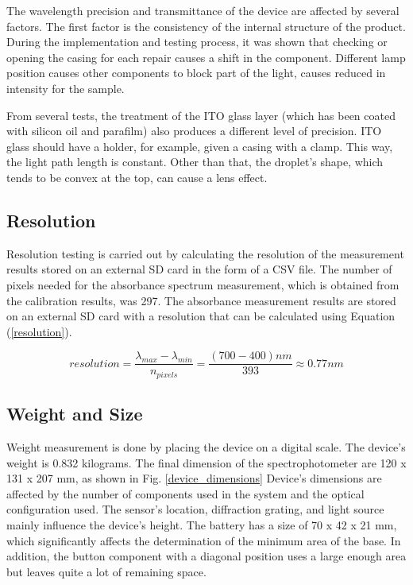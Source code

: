 \documentclass[conference]{IEEEtran}
\begin{document}
The wavelength precision and transmittance of the device are affected by several factors. 
The first factor is the consistency of the internal structure of the product.
During the implementation and testing process, it was shown that checking or opening the casing for each repair causes a shift in the component. 
Different lamp position causes other components to block part of the light, causes reduced in intensity for the sample.

From several tests, the treatment of the ITO glass layer (which has been coated with silicon oil and parafilm) also produces a different level of precision. 
ITO glass should have a holder, for example, given a casing with a clamp. 
This way, the light path length is constant. Other than that, the droplet's shape, which tends to be convex at the top, can cause a lens effect\cite{b5}.
    
\subsection{Resolution}
Resolution testing is carried out by calculating the resolution of the measurement results stored on an external SD card in the form of a CSV file.
The number of pixels needed for the absorbance spectrum measurement, which is obtained from the calibration results, was 297.
The absorbance measurement results are stored on an external SD card with a resolution that can be calculated using Equation (\ref{resolution}).

    \begin{equation}
    resolution=\frac{\lambda_{max} - \lambda_{min}}{n_{pixels}}=\frac{(700 - 400)nm}{393}\approx0.77nm
    \label{resolution}
    \end{equation}

\subsection{Weight and Size}
Weight measurement is done by placing the device on a digital scale.
The device's weight is 0.832 kilograms. 
The final dimension of the spectrophotometer are 120 x 131 x 207 mm, as shown in Fig. \ref{device_dimensions}
Device's dimensions are affected by the number of components used in the system and the optical configuration used. 
The sensor's location, diffraction grating, and light source mainly influence the device's height. 
The battery has a size of 70 x 42 x 21 mm, which significantly affects the determination of the minimum area of the base.
In addition, the button component with a diagonal position uses a large enough area but leaves quite a lot of remaining space.
\end{document}
